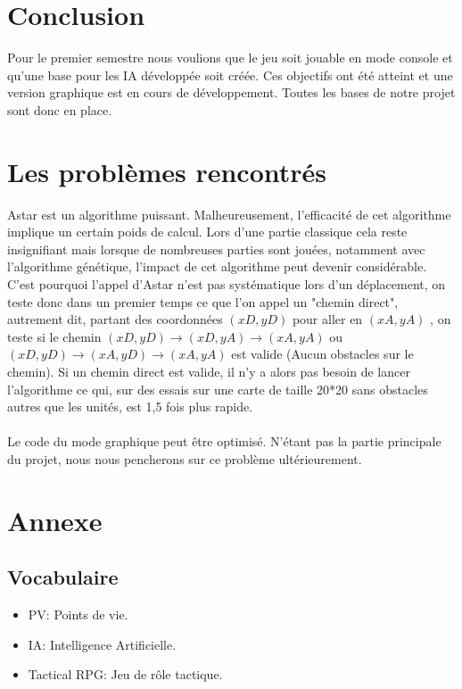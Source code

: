 \documentclass{article}
\begin{document}
\section{Conclusion}
 Pour le premier semestre nous voulions que le jeu soit jouable en mode console et qu'une base pour les IA développée soit créée. Ces objectifs ont été atteint et une version graphique est en cours de développement. Toutes les bases de notre projet sont donc en place.

\section{Les problèmes rencontrés}
Astar est un algorithme puissant. Malheureusement, l'efficacité de cet algorithme implique un certain poids de calcul. Lors d'une partie classique cela reste insignifiant mais lorsque de nombreuses parties sont jouées, notamment avec l'algorithme génétique, l'impact de cet algorithme peut devenir considérable. C'est pourquoi l'appel d'Astar n'est pas systématique lors d'un déplacement, on teste donc dans un premier temps ce que l'on appel un "chemin direct", autrement dit, partant des coordonnées $(xD,yD)$ pour aller en $(xA,yA)$ , on teste si le chemin $(xD,yD) \rightarrow (xD,yA) \rightarrow (xA,yA)$ ou $(xD,yD) \rightarrow (xA,yD) \rightarrow (xA,yA)$ est valide (Aucun obstacles sur le chemin). Si un chemin direct est valide, il n'y a alors pas besoin de lancer l'algorithme ce qui, sur des essais sur une carte de taille 20*20 sans obstacles autres que les unités, est 1,5 fois plus rapide. \\ \\
Le code du mode graphique peut être optimisé. N'étant pas la partie principale du projet, nous nous pencherons sur ce problème ultérieurement.  

\section{Annexe}
 \subsection{Vocabulaire}
 \begin{itemize}
  \item PV: Points de vie.
  \item IA: Intelligence Artificielle.
  \item Tactical RPG: Jeu de rôle tactique.
 \end{itemize}
 
\end{document}
